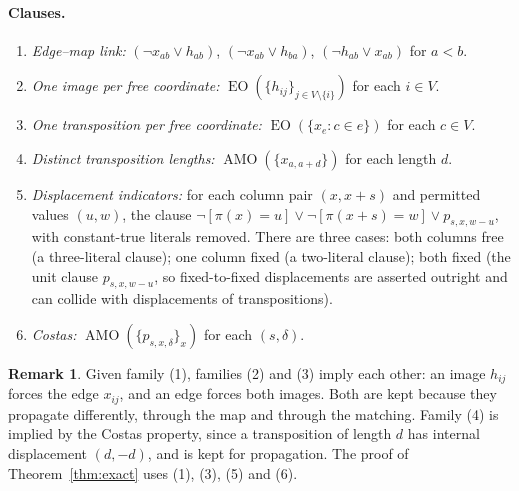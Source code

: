 \documentclass[11pt,a4paper]{article}
\theoremstyle{definition}
\newtheorem{remark}[theorem]{Remark}
\newcommand{\AMO}{\operatorname{AMO}}
\newcommand{\EO}{\operatorname{EO}}
\begin{document}
\paragraph{Clauses.}
\begin{enumerate}
\item \emph{Edge--map link:} $(\neg x_{ab}\vee h_{ab})$, $(\neg x_{ab}\vee h_{ba})$,
$(\neg h_{ab}\vee x_{ab})$ for $a<b$.
\item \emph{One image per free coordinate:} $\EO(\{h_{ij}\}_{j\in V\setminus\{i\}})$ for
each $i\in V$.
\item \emph{One transposition per free coordinate:} $\EO(\{x_e: c\in e\})$ for each $c\in V$.
\item \emph{Distinct transposition lengths:} $\AMO(\{x_{a,a+d}\})$ for each length $d$.
\item \emph{Displacement indicators:} for each column pair $(x,x+s)$ and permitted values
$(u,w)$, the clause $\neg[\pi(x)=u]\vee\neg[\pi(x+s)=w]\vee p_{s,x,w-u}$, with constant-true
literals removed. There are three cases: both columns free (a three-literal clause); one
column fixed (a two-literal clause); both fixed (the unit clause $p_{s,x,w-u}$, so
fixed-to-fixed displacements are asserted outright and can collide with displacements of
transpositions).
\item \emph{Costas:} $\AMO(\{p_{s,x,\delta}\}_x)$ for each $(s,\delta)$.
\end{enumerate}

\begin{remark}
Given family (1), families (2) and (3) imply each other: an image $h_{ij}$ forces the edge
$x_{ij}$, and an edge forces both images. Both are kept because they propagate differently,
through the map and through the matching. Family (4) is implied by the Costas property,
since a transposition of length $d$ has internal displacement $(d,-d)$, and is kept for
propagation. The proof of Theorem~\ref{thm:exact} uses (1), (3), (5) and (6).
\end{remark}
\end{document}
